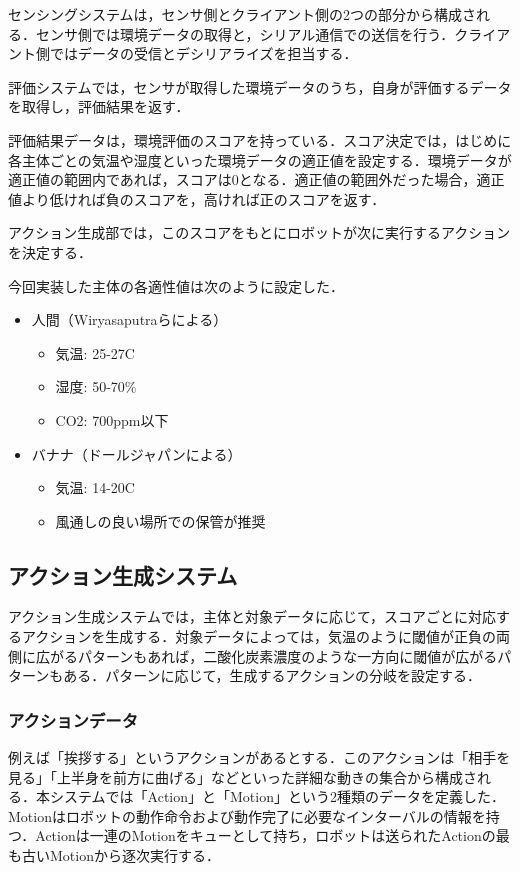 \documentclass[paper=a4paper,jafontsize=9pt,head_space=15mm,gutter=20mm,
twocolumn,number_of_lines=49, line_length=26zw]{myuarticle}
\begin{document}
センシングシステムは，センサ側とクライアント側の2つの部分から構成される．センサ側では環境データの取得と，シリアル通信での送信を行う．クライアント側ではデータの受信とデシリアライズを担当する．

評価システムでは，センサが取得した環境データのうち，自身が評価するデータを取得し，評価結果を返す．

評価結果データは，環境評価のスコアを持っている．スコア決定では，はじめに各主体ごとの気温や湿度といった環境データの適正値を設定する．環境データが適正値の範囲内であれば，スコアは0となる．適正値の範囲外だった場合，適正値より低ければ負のスコアを，高ければ正のスコアを返す．

アクション生成部では，このスコアをもとにロボットが次に実行するアクションを決定する．

今回実装した主体の各適性値は次のように設定した．

\begin{itemize}
  \item
    人間（Wiryasaputraら\cite{Wiryasaputra-2023-ReviewIntelligentIndoorEnvironment}による）
    \begin{itemize}
      \item 気温: 25-27\textdegree C
      \item 湿度: 50-70\%
      \item CO2: 700ppm以下
    \end{itemize}

  \item バナナ（ドールジャパン\cite{--バナナの}による）
    \begin{itemize}
      \item 気温: 14-20\textdegree C
      \item 風通しの良い場所での保管が推奨
    \end{itemize}
\end{itemize}



\subsection{アクション生成システム}
アクション生成システムでは，主体と対象データに応じて，スコアごとに対応するアクションを生成する．対象データによっては，気温のように閾値が正負の両側に広がるパターンもあれば，二酸化炭素濃度のような一方向に閾値が広がるパターンもある．パターンに応じて，生成するアクションの分岐を設定する．

\subsubsection{アクションデータ}
例えば「挨拶する」というアクションがあるとする．このアクションは「相手を見る」「上半身を前方に曲げる」などといった詳細な動きの集合から構成される．本システムでは「Action」と「Motion」という2種類のデータを定義した．Motionはロボットの動作命令および動作完了に必要なインターバルの情報を持つ．Actionは一連のMotionをキューとして持ち，ロボットは送られたActionの最も古いMotionから逐次実行する．
\end{document}
